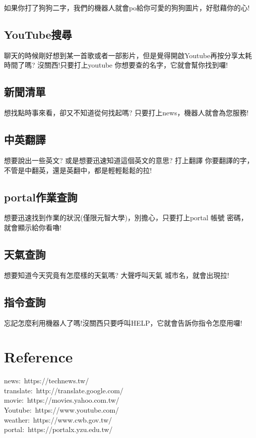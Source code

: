 \documentclass{scrreprt}
\begin{document}
\begin{CJK}{UTF8}{bkai}
如果你打了{\color{red}狗狗}二字，我們的機器人就會po給你可愛的狗狗圖片，好慰藉你的心!

\section{YouTube搜尋}

聊天的時候剛好想到某一首歌或者一部影片，但是覺得開啟Youtube再按分享太耗時間了嗎? 沒關西!只要打上{\color{red}youtube 你想要查的名字}，它就會幫你找到囉!

\section{新聞清單}

想找點時事來看，卻又不知道從何找起嗎? 只要打上{\color{red}news}，機器人就會為您服務!

\section{中英翻譯}

想要說出一些英文? 或是想要迅速知道這個英文的意思? 打上{\color{red}翻譯 你要翻譯的字}，不管是中翻英，還是英翻中，都是輕輕鬆鬆的拉!

\section{portal作業查詢}

想要迅速找到作業的狀況(僅限元智大學)，別擔心，只要打上{\color{red}portal 帳號 密碼}，就會顯示給你看嚕!

\section{天氣查詢}

想要知道今天究竟有怎麼樣的天氣嗎? 大聲呼叫{\color{red}天氣 城市名}，就會出現拉!

\section{指令查詢}

忘記怎麼利用機器人了嗎!沒關西只要呼叫{\color{red}HELP}，它就會告訴你指令怎麼用囉!

\chapter{Reference}

news$:$ {\color{blue}https://technews.tw/}\\
translate$:$ {\color{blue}http://translate.google.com/}\\
movie$:$ {\color{blue}https://movies.yahoo.com.tw/}\\
Youtube$:$ {\color{blue}https://www.youtube.com/}\\
weather$:$ {\color{blue}https://www.cwb.gov.tw/}\\
portal$:$ {\color{blue}https://portalx.yzu.edu.tw/}

\end{CJK}
\end{document}

